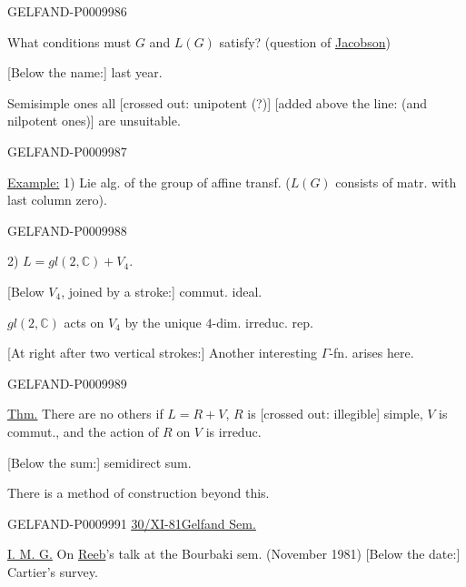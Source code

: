 \begin{GelfandAdjacentEvidence}{GELFAND-P000998}{6}


What conditions must $G$ and $L(G)$ satisfy? (question of \underline{Jacobson})

[Below the name:] last year.

Semisimple ones all [crossed out: unipotent (?)] [added above the line: (and nilpotent ones)] are unsuitable.
\end{GelfandAdjacentEvidence}
\begin{GelfandAdjacentEvidence}{GELFAND-P000998}{7}


\underline{Example:} 1) Lie alg. of the group of affine transf. ($L(G)$ consists of matr. with last column zero).
\end{GelfandAdjacentEvidence}
\begin{GelfandAdjacentEvidence}{GELFAND-P000998}{8}


2) $L=gl(2,\mathbb C)+V_4$.

[Below $V_4$, joined by a stroke:] commut. ideal.

$gl(2,\mathbb C)$ acts on $V_4$ by the unique $4$-dim. irreduc. rep.

[At right after two vertical strokes:] Another interesting $\Gamma$-fn. arises here.
\end{GelfandAdjacentEvidence}
\begin{GelfandAdjacentEvidence}{GELFAND-P000998}{9}


\underline{Thm.} There are no others if $L=R+V$, $R$ is [crossed out: illegible] simple, $V$ is commut., and the action of $R$ on $V$ is irreduc.
\end{GelfandAdjacentEvidence}


[Below the sum:] semidirect sum.

There is a method of construction beyond this.


\begin{GelfandAdjacentEvidence}{GELFAND-P000999}{1}
\underline{\underline{30/XI-81}}\quad\underline{Gelfand Sem.}

\underline{I. M. G.} On \underline{Reeb}'s talk at the Bourbaki sem. (November 1981)
[Below the date:] Cartier's survey.
\end{GelfandAdjacentEvidence}


